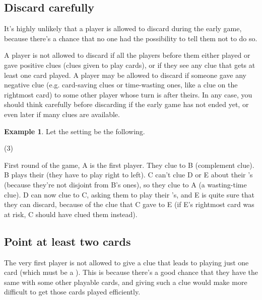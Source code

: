\documentclass[a4paper]{article}
\theoremstyle{plain}
\theoremstyle{definition}
\newtheorem{example}[theorem]{Example}
\begin{document}
\subsection{Discard carefully}

It's highly unlikely that a player is allowed to discard during the early game, because there's a chance that no one had the possibility to tell them not to do so.

A player is not allowed to discard if all the players before them either played or gave positive clues (clues given to play cards), or if they see any clue that gets at least one card played. A player may be allowed to discard if someone gave any negative clue (e.g. card-saving clues or time-wasting ones, like a  clue on the rightmost card) to some other player whose turn is after theirs. In any case, you should think carefully before discarding if the early game has not ended yet, or even later if many clues are available.

\begin{example}
	
	Let the setting be the following.
	
	\begin{tasks}(3)
		\task[+]      
		\task[A]    
		\task[B]    
		\task[C]    
		\task[D]    
		\task[E]    
	\end{tasks}
	
	First round of the game, A is the first player. They clue  to B (complement clue). B plays their  (they have to play right to left). C can't clue D or E about their 's (because they're not disjoint from B's ones), so they clue  to A (a wasting-time clue). D can now clue  to C, asking them to play their 's, and E is quite sure that they can discard, because of the  clue that C gave to E (if E's rightmost card was at risk, C should have clued them instead).
\end{example}

\subsection{Point at least two cards}

The very first player is not allowed to give a clue that leads to playing just one card (which must be a ). This is because there's a good chance that they have the same  with some other playable cards, and giving such a clue would make more difficult to get those cards played efficiently.
\end{document}
